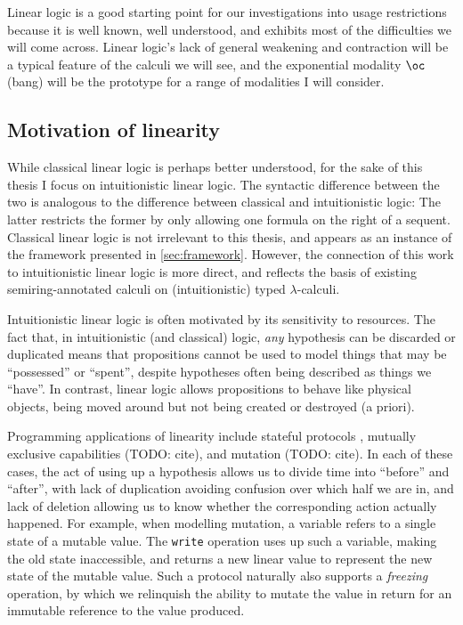 Linear logic is a good starting point for our investigations into usage
restrictions because it is well known, well understood, and exhibits most of the
difficulties we will come across.
Linear logic's lack of general weakening and contraction will be a typical
feature of the calculi we will see, and the exponential modality $\oc$ (bang)
will be the prototype for a range of modalities I will consider.

\subsection{Motivation of linearity}

While classical linear logic is perhaps better understood, for the sake of this
thesis I focus on intuitionistic linear logic.
The syntactic difference between the two is analogous to the difference between
classical and intuitionistic logic: The latter restricts the former by only
allowing one formula on the right of a sequent.
Classical linear logic is not irrelevant to this thesis, and appears as an
instance of the framework presented in \cref{sec:framework}.
However, the connection of this work to intuitionistic linear logic is more
direct, and reflects the basis of existing semiring-annotated calculi on
(intuitionistic) typed $\lambda$-calculi.

Intuitionistic linear logic is often motivated by its sensitivity to resources.
The fact that, in intuitionistic (and classical) logic, \emph{any} hypothesis
can be discarded or duplicated means that propositions cannot be used to model
things that may be ``possessed'' or ``spent'', despite hypotheses often being
described as things we ``have''.
In contrast, linear logic allows propositions to behave like physical objects,
being moved around but not being created or destroyed (a priori).

Programming applications of linearity include stateful protocols
\citep{Wadler12}, mutually exclusive capabilities (TODO: cite),
and mutation (TODO: cite).
In each of these cases, the act of using up a hypothesis allows us to divide
time into ``before'' and ``after'', with lack of duplication avoiding confusion
over which half we are in, and lack of deletion allowing us to know whether the
corresponding action actually happened.
For example, when modelling mutation, a variable refers to a single state of a
mutable value.
The \texttt{write} operation uses up such a variable, making the old state
inaccessible, and returns a new linear value to represent the new state of the
mutable value.
Such a protocol naturally also supports a \emph{freezing} operation, by which we
relinquish the ability to mutate the value in return for an immutable reference
to the value produced.

